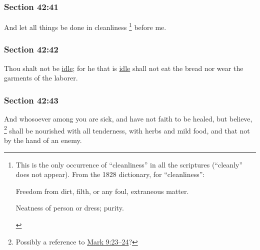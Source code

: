 	\subsubsection{Section 42:41} %
		\label{DC42-41}

		And let all things be done in cleanliness%
			\footnote{%
				This is the only occurrence of ``cleanliness'' in all the scriptures (``cleanly'' does not appear). From the 1828 dictionary, for ``cleanliness'':
					\begin{compactitem}
						\item[1] Freedom from dirt, filth, or any foul, extraneous matter.
						\item[2] Neatness of person or dress; purity.
					\end{compactitem}
				}
		before me.


	\subsubsection{Section 42:42} %
		\label{DC42-42}

		Thou shalt not be \hyperref[IDLENESS]{idle}; for he that is \hyperref[IDLENESS]{idle} shall not eat the bread nor wear the garments of the laborer.


	\subsubsection{Section 42:43} %
		\label{DC42-43}

		And whosoever among you are sick, and have not faith to be healed, but believe,%
			\footnote{%
				Possibly a reference to \hyperref[MARK-9-23]{Mark 9:23--24}?
				}
		shall be nourished with all tenderness, with herbs and mild food, and that not by the hand of an enemy.

